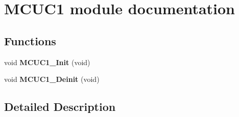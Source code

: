 \hypertarget{group___m_c_u_c1__module}{}\section{M\+C\+U\+C1 module documentation}
\label{group___m_c_u_c1__module}
\subsection*{Functions}
\begin{DoxyCompactItemize}
\item 
\mbox{\label{group___m_c_u_c1__module_gab1123ec02399c64e7385620802d9de5e}} 
void {\bfseries M\+C\+U\+C1\+\_\+\+Init} (void)
\item 
\mbox{\label{group___m_c_u_c1__module_ga469ebc629b15eaeaffa6b1ead3ed7bce}} 
void {\bfseries M\+C\+U\+C1\+\_\+\+Deinit} (void)
\end{DoxyCompactItemize}


\subsection{Detailed Description}
